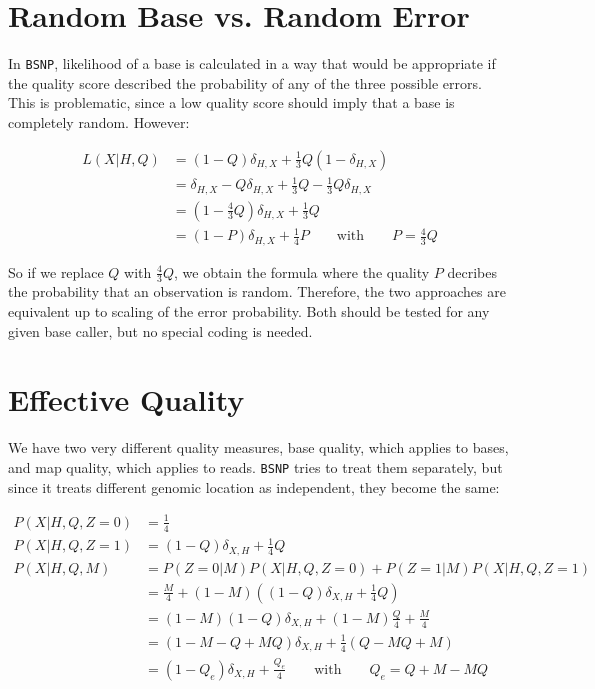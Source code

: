 \documentclass{article}
\begin{document}
\appendix

\section{Random Base vs. Random Error}
\label{app_errprob}

In \texttt{BSNP}, likelihood of a base is calculated in a way that would be appropriate if the quality score described the
probability of any of the three possible errors.  This is problematic, since a low quality score should imply that a base is
completely random.  However:

\begin{align*}
L(X|H,Q) &= (1-Q)\delta_{H,X} + \frac{1}{3} Q (1-\delta_{H,X}) \\
&= \delta_{H,X} - Q\delta_{H,X} + \frac{1}{3}Q - \frac{1}{3}Q\delta_{H,X} \\
&= (1-\frac{4}{3}Q)\delta_{H,X} + \frac{1}{3}Q \\
&= (1-P) \delta_{H,X} + \frac{1}{4}P \qquad \mbox{with} \qquad P=\frac{4}{3}Q
\end{align*}

So if we replace $Q$ with $\frac{4}{3}Q$, we obtain the formula where the quality $P$ decribes the probability that an observation
is random.  Therefore, the two approaches are equivalent up to scaling of the error probability.  Both should be tested for any
given base caller, but no special coding is needed.

\section{Effective Quality}
\label{app_qualities}

We have two very different quality measures, base quality, which applies to bases, and map quality, which applies to reads.
\texttt{BSNP} tries to treat them separately, but since it treats different genomic location as independent, they become the same:

\begin{align*}
P(X|H,Q,Z=0) &= \frac{1}{4} \\
P(X|H,Q,Z=1) &= (1-Q)\delta_{X,H} + \frac{1}{4}Q \\
P(X|H,Q,M) &= P(Z=0|M) P(X|H,Q,Z=0) + P(Z=1|M) P(X|H,Q,Z=1) \\
&= \frac{M}{4} + (1-M)\left((1-Q)\delta_{X,H} + \frac{1}{4}Q \right) \\
&= (1-M)(1-Q)\delta_{X,H} + (1-M)\frac{Q}{4} + \frac{M}{4} \\
&= (1-M-Q+MQ) \delta_{X,H} + \frac{1}{4}(Q-MQ+M) \\
&= (1-Q_e) \delta_{X,H} + \frac{Q_e}{4} \qquad \mbox{with} \qquad Q_e = Q+M-MQ
\end{align*}
\end{document}
